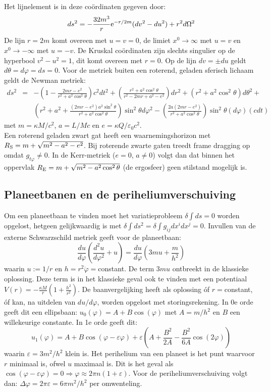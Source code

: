 Het lijnelement is in deze co\"ordinaten gegeven door:
\[
ds^2=-\frac{32m^3}{r}{\rm e}^{-r/2m}(dv^2-du^2)+r^2d\Omega^2
\]
De lijn $r=2m$ komt overeen met $u=v=0$, de limiet $x^0\rightarrow\infty$ met
$u=v$ en $x^0\rightarrow-\infty$ met $u=-v$. De Kruskal co\"ordinaten zijn
slechts singulier op de hyperbool $v^2-u^2=1$, dit komt overeen met $r=0$.
Op de lijn $dv=\pm du$ geldt $d\theta=d\varphi=ds=0$.
\npar
Voor de metriek buiten een roterend, geladen sferisch lichaam geldt de Newman
metriek:
\begin{eqnarray*}
ds^2&=&-\left(1-\frac{2mr-e^2}{r^2+a^2\cos^2\theta}\right)c^2dt^2+
  \left(\frac{r^2+a^2\cos^2\theta}{r^2-2mr+a^2-e^2}\right)dr^2+
  (r^2+a^2\cos^2\theta)d\theta^2+\\
&&\left(r^2+a^2+\frac{(2mr-e^2)a^2\sin^2\theta}{r^2+a^2\cos^2\theta}\right)\sin^2\theta d\varphi^2-
  \left(\frac{2a(2mr-e^2)}{r^2+a^2\cos^2\theta}\right)\sin^2\theta(d\varphi)(cdt)
\end{eqnarray*}
met $m=\kappa M/c^2$, $a=L/Mc$ en $e=\kappa Q/\varepsilon_0c^2$.\\
Een roterend geladen zwart gat heeft een waarnemingshorizon met
$R_{\rm S}=m+\sqrt{m^2-a^2-e^2}$.
\npar
Bij roterende zwarte gaten treedt frame dragging op omdat $g_{t\varphi}\neq0$.
In de Kerr-metriek ($e=0$, $a\neq0$) volgt dan dat binnen het oppervlak
$R_{\rm E}=m+\sqrt{m^2-a^2\cos^2\theta}$ (de ergosfeer) geen stilstand
mogelijk is.

\subsection{Planeetbanen en de periheliumverschuiving}
Om een planeetbaan te vinden moet het variatieprobleem $\delta\int ds=0$
worden opgelost, hetgeen gelijkwaardig is met $\delta\int ds^2=\delta\int g_{ij}dx^idx^j=0$.
Invullen van de externe Schwarzschild metriek geeft voor de planeetbaan:
\[
\frac{du}{d\varphi}\left(\frac{d^2u}{d\varphi^2}+u\right)=\frac{du}{d\varphi}\left(3mu+\frac{m}{h^2}\right)
\]
waarin $u:=1/r$ en $h=r^2\dot{\varphi}=$constant. De term $3mu$ ontbreekt in
de klassieke oplossing. Deze term is in het klassieke geval ook te vinden met
een potentiaal $\displaystyle V(r)=-\frac{\kappa M}{r}\left(1+\frac{h^2}{r^2}\right)$.
\npar
De baanvergelijking heeft als oplossing \'of $r=$constant, \'of kan, na
uitdelen van $du/d\varphi$, worden opgelost met storingsrekening. In 0e orde
geeft dit een ellipsbaan: $u_0(\varphi)=A+B\cos(\varphi)$ met $A=m/h^2$ en
$B$ een willekeurige constante. In 1e orde geeft dit:
\[
u_1(\varphi)=A+B\cos(\varphi-\varepsilon\varphi)+\varepsilon
\left(A+\frac{B^2}{2A}-\frac{B^2}{6A}\cos(2\varphi)\right)
\]
waarin $\varepsilon=3m^2/h^2$ klein is. Het perihelium van een planeet is het
punt waarvoor $r$ minimaal is, ofwel $u$ maximaal is. Dit is het geval als
$\cos(\varphi-\varepsilon\varphi)=0\Rightarrow\varphi\approx2\pi n(1+\varepsilon)$.
Voor de periheliumverschuiving volgt dan:
$\Delta\varphi=2\pi\varepsilon=6\pi m^2/h^2$ per omwenteling.


